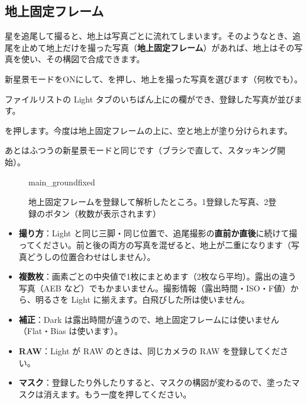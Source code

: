 \subsection{地上固定フレーム}\label{sec:groundfixed}

星を追尾して撮ると、地上は写真ごとに流れてしまいます。そのようなとき、追尾を止めて地上だけを撮った写真（\textbf{地上固定フレーム}）があれば、地上はその写真を使い、その構図で合成できます。

\begin{steps}
  \item 新星景モードをONにして、を押し、地上を撮った写真を選びます（何枚でも）。
  \item ファイルリストの Light タブのいちばん上にの欄ができ、登録した写真が並びます。
  \item {}を押します。今度は地上固定フレームの上に、空と地上が塗り分けられます。
  \item あとはふつうの新星景モードと同じです（ブラシで直して、スタッキング開始）。
\end{steps}

\begin{figure}[H]
\centering
\begin{screenshot}{main_groundfixed}
\end{screenshot}
\caption{地上固定フレームを登録して解析したところ。\num{1}登録した写真、\num{2}登録のボタン（枚数が表示されます）}
\end{figure}

\begin{itemize}[itemsep=0.4ex]
  \item \textbf{撮り方}：Light と同じ三脚・同じ位置で、追尾撮影の\textbf{直前か直後}に続けて撮ってください。前と後の両方の写真を混ぜると、地上が二重になります（写真どうしの位置合わせはしません）。
  \item \textbf{複数枚}：画素ごとの中央値で1枚にまとめます（2枚なら平均）。露出の違う写真（AEB など）でもかまいません。撮影情報（露出時間・ISO・F値）から、明るさを Light に揃えます。白飛びした所は使いません。
  \item \textbf{補正}：Dark は露出時間が違うので、地上固定フレームには使いません（Flat・Bias は使います）。
  \item \textbf{RAW}：Light が RAW のときは、同じカメラの RAW を登録してください。
  \item \textbf{マスク}：登録したり外したりすると、マスクの構図が変わるので、塗ったマスクは消えます。もう一度を押してください。
\end{itemize}

